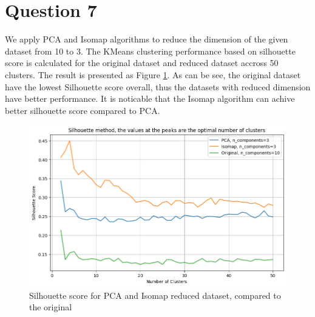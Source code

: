\section{Question 7}
We apply PCA and Isomap algorithms \cite{anowar2021conceptual} to reduce the dimension of the given dataset from 10 to 3.
The KMeans clustering performance based on silhouette score is calculated for the original dataset and reduced dataset accross 50 clusters.
The result is presented as Figure \ref{Fig: Sil-dim3}.
As can be see, the original dataset have the lowest Silhouette score overall, thus the datasets with reduced dimension have better performance.
It is noticable that the Isomap algorithm can achive better silhouette score compared to PCA.

\begin{figure}
    \centering
    \includegraphics[width=\textwidth]{Appendices/Sil-Dim3.png}
    \caption{Silhouette score for PCA and Isomap reduced dataset, compared to the original}
    \label{Fig: Sil-dim3}
\end{figure}